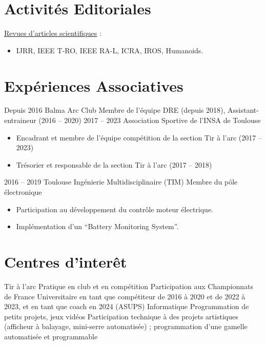 \documentclass[11pt,a4paper,sans]{moderncv}         %
\newcommand{\items}{\item \hspace{2mm}}
\begin{document}
\section{Activit\'es  Editoriales}
\large{\underline{Revues d'articles scientifiques} :}
\begin{itemize}%
\items IJRR, IEEE T-RO, IEEE RA-L, ICRA, IROS, Humanoids.
\end{itemize}

\section{Exp\'eriences Associatives}
\cventry
{Depuis 2016}
{Balma Arc Club}
{Membre de l'\'equipe DRE (depuis 2018), Assistant-entraineur (2016 -- 2020)}
{}
{}
{}
%
\cventry
{2017 -- 2023}
{Association Sportive de l'INSA de Toulouse}
{}
{}
{}
{
  \begin{itemize}
    \item Encadrant et membre de l'\'equipe comp\'etition de la section Tir \`a l'arc (2017 -- 2023)
    \item Tr\'esorier et responsable de la section Tir \`a l'arc (2017 -- 2018)
  \end{itemize}
}
%
\cventry
{2016 -- 2019}
{Toulouse Ing\'enierie Multidisciplinaire (TIM)}
{Membre du p\^ole \'electronique}
{}
{}
{
  \begin{itemize}
    \item Participation au d\'eveloppement du contr\^ole moteur \'electrique.
    \item Impl\'ementation d'un ``Battery Monitoring System''.
  \end{itemize}
}
%

\section{Centres d'inter\^et}

\cventry
{Tir \`a l'arc}
{Pratique en club et en comp\'etition}
{Participation aux Championnats de France Universitaire en tant que compétiteur de 2016 \`a 2020 et de 2022 \`a 2023, et en tant que coach en 2024 (ASUPS)}
{}
{}
{}
%
\cventry
{Informatique}
{Programmation de petits projets, jeux vid\'eos}
{Participation technique \`a des projets artistiques (afficheur \`a balayage, mini-serre automatis\'ee) ; programmation d'une gamelle automatis\'ee et programmable}
{}
{}
{}
%




\end{document}
